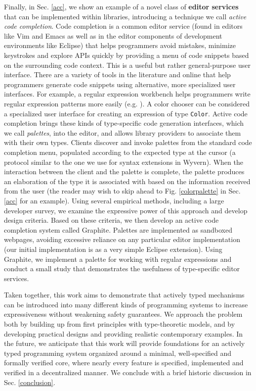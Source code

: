 Finally, in Sec. \ref{acc}, we show an example of a novel class of \textbf{editor services} that can be implemented within libraries, introducing a technique we call \emph{active code completion}. Code completion is a common editor service (found in editors like Vim and Emacs as well as in the editor components of development environments like Eclipse) that helps programmers avoid mistakes, minimize keystrokes and explore APIs quickly by providing a menu of code snippets based on the surrounding code context. This is a useful but rather general-purpose user interface. There are a variety of tools in the literature and online that help programmers generate code snippets using alternative, more specialized user interfaces. For example, a regular expression workbench helps programmers write regular expression patterns more easily (e.g. \cite{IntelliJRegexp,_txt2re:_????}). A color chooser can be considered a specialized user interface for creating an expression of type \verb|Color|. 
Active code completion brings these kinds of type-specific code generation interfaces, which we call \emph{palettes}, into the editor, and allows library providers to associate them with their own types. Clients discover and invoke palettes from the standard code completion menu, populated according to the expected type at the cursor (a protocol similar to the one we use for syntax extensions in Wyvern). When the interaction between the client and the palette is complete, the palette produces an elaboration of the type it is associated with based on the information received from the user (the reader may wish to skip ahead to Fig. \ref{colorpalette} in Sec. \ref{acc} for an example). Using several empirical
methods, including a large developer survey, we examine the expressive power of this approach and develop design criteria. Based on these criteria, we then develop an active code completion system called Graphite. Palettes are implemented as sandboxed webpages, avoiding excessive reliance on any particular editor implementation (our initial implementation is as a very simple Eclipse extension). Using Graphite,
we implement a palette for working with regular expressions and conduct a small study that demonstrates the usefulness of type-specific editor services.%

Taken together, this work aims to demonstrate that actively typed mechanisms can be introduced into many different kinds of programming systems to increase expressiveness without  weakening safety guarantees. We approach the problem both by building up from first principles with type-theoretic models, and by developing practical designs and providing realistic contemporary examples.  
In the future, we anticipate that this work will provide foundations for an actively typed programming system organized around a minimal, well-specified and formally verified core, where nearly every feature is specified, implemented and verified in a decentralized manner. We conclude with a brief historic discussion in Sec. \ref{conclusion}.

